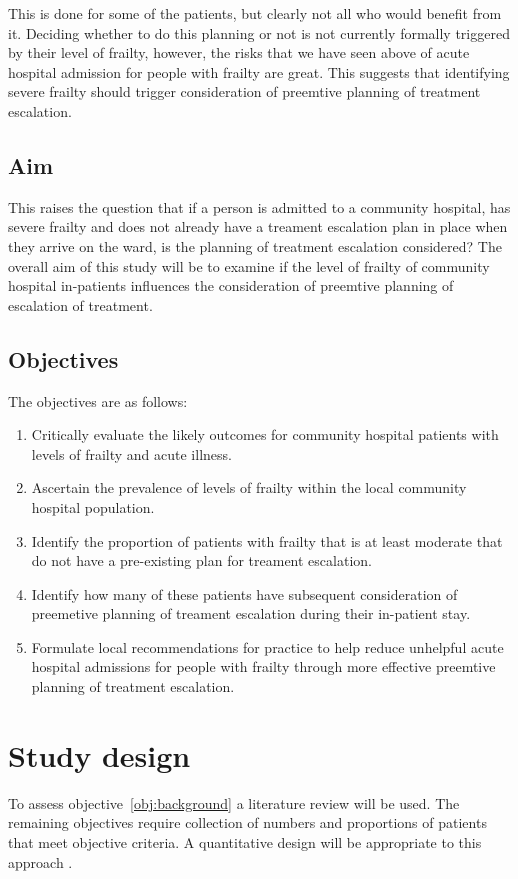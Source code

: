 \documentclass
[
	12pt,
	a4paper,
	oneside,
]{article}
\begin{document}
This is done for some of the patients, but clearly not all who would benefit from it. 
Deciding whether to do this planning or not is not currently formally triggered 
by their level of frailty, however, the risks that we have seen above of acute hospital 
admission for people with frailty are great. This suggests that identifying severe frailty 
should trigger consideration of preemtive planning of treatment escalation.

\subsection{Aim}
This raises the question that if a person is admitted to a community hospital, has 
severe frailty and does not already have a treament escalation plan in place when they 
arrive on the ward, is the planning of treatment escalation considered? The overall 
aim of this study will be to examine if the level of frailty of community hospital
in-patients influences the consideration of preemtive planning of escalation of 
treatment.

\subsection{Objectives}

The objectives are as follows:
\begin{enumerate}
\item	Critically evaluate the likely outcomes for community hospital patients 
		with levels of frailty and acute illness. \label{obj:background}
\item	Ascertain the prevalence of levels of frailty within the local community
		hospital population. \label{obj:prevalence}
\item	Identify the proportion of patients with frailty that is at least moderate
		that do not have a pre-existing plan for treament escalation. \label{obj:noplan}
\item	Identify how many of these patients have subsequent consideration of preemetive planning
		of treament escalation during their in-patient stay. \label{obj:association}
\item	Formulate local recommendations for practice to help reduce unhelpful
		acute hospital admissions for people with frailty through more effective
		preemtive planning of treatment escalation.
\end{enumerate}

\section{Study design} 
\label{sec:design}
To assess objective~\ref{obj:background} a literature review will be used. 
The remaining objectives require collection of numbers
and proportions of patients that meet objective criteria. A quantitative design
will be appropriate to this approach \parencite{parahoo:14}.
\end{document}
